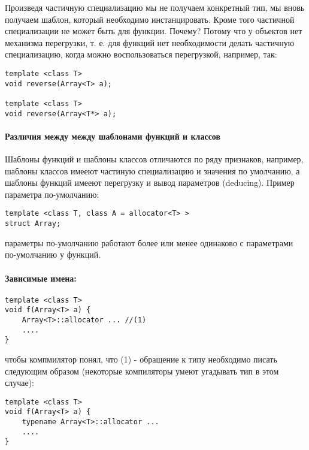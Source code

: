 Произведя частичную специализацию мы не получаем конкретный тип, мы вновь получаем шаблон, который необходимо инстанцировать. Кроме того частичной специализации
не может быть для функции. Почему? Потому что у объектов нет механизма перегрузки, т. е. для функций нет необходимости делать частичную специализацию, когда
можно воспользоваться перегрузкой, например, так:
\begin{lstlisting}
template <class T>
void reverse(Array<T> a);

template <class T>
void reverse(Array<T*> a);
\end{lstlisting}

\paragraph{Различия между между шаблонами функций и классов}

Шаблоны функций и шаблоны классов отличаются по ряду признаков, например, шаблоны классов имееют частиную специализацию и значения по умолчанию, а шаблоны
функций имееют перегрузку и вывод параметров (deducing). Пример параметра по-умолчанию:
\begin{lstlisting}
template <class T, class A = allocator<T> >
struct Array;
\end{lstlisting}
параметры по-умолчанию работают более или менее одинаково с параметрами по-умолчанию у функций.

\paragraph{Зависимые имена:}
\begin{lstlisting}
template <class T>
void f(Array<T> a) {
	Array<T>::allocator ... //(1)
	....
}
\end{lstlisting}
чтобы компмилятор понял, что (1) - обращение к типу необходимо писать следующим образом (некоторые компиляторы умеют угадывать тип в этом случае):
\begin{lstlisting}
template <class T>
void f(Array<T> a) {
	typename Array<T>::allocator ...
	....
}
\end{lstlisting}